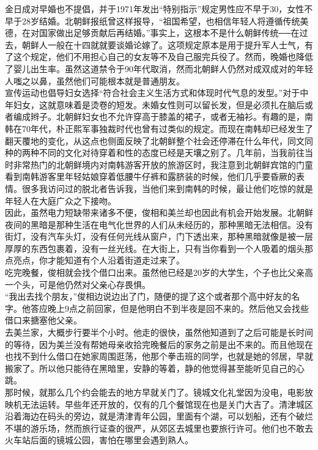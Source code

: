 金日成对早婚也不提倡，并于1971年发出“特别指示”规定男性应不早于30，女性不早于28岁结婚。北朝鲜报纸曾这样报导，“祖国希望，也相信年轻人将遵循传统美德，在对国家做出足够贡献后再结婚。”事实上，这根本不是什么朝鲜传统──在过去，朝鲜人一般在十四就就要谈婚论嫁了。这项规定原本是用于提升军人士气，有了这个规定，他们不用担心自己的女友等不及自己服完兵役了。然而，晚婚也降低了婴儿出生率。虽然这道禁令于90年代取消，然而北朝鲜人仍然对成双成对的年轻人嗤之以鼻，虽然他们可能根本就是普通朋友。\\

宣传运动也倡导妇女选择“符合社会主义生活方式和体现时代气息的发型。”对于中年妇女，这就意味着是烫卷的短发。未婚女性则可以留长发，但是必须扎在脑后或者编成辫子。北朝鲜妇女也不允许穿高于膝盖的裙子，或者无袖衫。有趣的是，南韩在70年代，朴正熙军事独裁时代也曾有过类似的规定。而现在南韩却已经发生了翻天覆地的变化，从这点也侧面反映了北朝鲜整个社会还停滞在什么年代，同文同种的两种不同的文化对待穿着和性的态度已经是天壤之别了。几年前，当我前往当时非常热门的北朝鲜境内对南韩游客开放的旅游区时，我注意到北朝鲜宾馆的门童看到南韩游客里年轻姑娘穿着低腰牛仔裤和露脐装的时候，他们几乎要昏厥的表情。很多我访问过的脱北者告诉我，当他们来到南韩的时候，最让他们吃惊的就是年轻人在大庭广众之下接吻。\\

因此，虽然电力短缺带来诸多不便，俊相和美兰却也因此有机会开始发展。北朝鲜夜间的黑暗是那种生活在电气化世界的人们从未经历的，那种黑暗无法相信。没有街灯，没有汽车头灯，没有任何光线从窗户，门下透出来，那种黑暗就像是被一层厚厚的东西包裹着，没有一丝光线。在大街上，只有当你看到一个人吸着的烟头那点亮点，你才能知道有个人沿着街道走过来了。\\

吃完晚餐，俊相就会找个借口出来。虽然他已经是20岁的大学生，个子也比父亲高一个头，可是他仍然对父亲心存畏惧。\\

“我出去找个朋友，”俊相边说边出了门，随便的提了这个或者那个高中好友的名字。他答应晚上9点之前回家，但是他明白不到半夜是回不来的。然后他又会找些借口来搪塞他父亲。\\

去美兰家，大概步行要半个小时。他走的很快，虽然他知道到了之后可能是长时间的等待，因为美兰没有帮她母亲收拾完晚餐后的家务之前是出不来的。而且他现在也找不到什么借口在她家周围逛荡，他那个拳击班的同学，也就是她的邻居，早就搬家了。所以他只能待在黑暗里，安静的等着，静的他觉得甚至能听见自己的心跳。\\

那时候，就那么几个约会能去的地方早就关门了。镜城文化礼堂因为没电，电影放映机无法运转。早些年还开放的，仅有的几个餐馆现在也是关门大吉了。清津城区沿着海边在码头的旁边，就是清津青年公园，里面有个湖，可以划船，还有个破烂不堪的游乐场，然而旅行证查的很严，从郊区去城里也要旅行许可。他们也不敢去火车站后面的镜城公园，害怕在哪里会遇到熟人。\\

